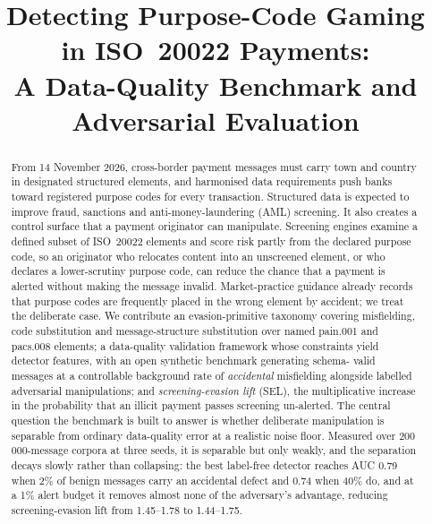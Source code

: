 \documentclass[conference]{IEEEtran}
\begin{document}
\title{Detecting Purpose-Code Gaming in ISO~20022 Payments:\\
A Data-Quality Benchmark and Adversarial Evaluation}

\author{
}

\maketitle

\begin{abstract}
From 14 November 2026, cross-border payment messages must carry town and
country in designated structured elements, and harmonised data requirements
push banks toward registered purpose codes for every transaction. Structured
data is expected to improve fraud, sanctions and anti-money-laundering (AML)
screening. It also creates a control surface that a payment originator can
manipulate. Screening engines examine a defined subset of ISO~20022 elements
and score risk partly from the declared purpose code, so an originator who
relocates content into an unscreened element, or who declares a
lower-scrutiny purpose code, can reduce the chance that a payment is alerted
without making the message invalid. Market-practice guidance already records
that purpose codes are frequently placed in the wrong element by accident; we
treat the deliberate case. We contribute an evasion-primitive taxonomy covering misfielding, code
substitution and message-structure substitution over named pain.001 and
pacs.008 elements; a data-quality validation framework whose constraints
yield detector features, with an open synthetic benchmark generating schema-
valid messages at a controllable background rate of \emph{accidental}
misfielding alongside labelled adversarial manipulations; and
\emph{screening-evasion lift} (SEL), the multiplicative increase in the
probability that an illicit payment passes screening un-alerted. The central question the benchmark is built to answer is whether
deliberate manipulation is separable from ordinary data-quality error at a
realistic noise floor. Measured over 200\,000-message corpora at three seeds,
it is separable but only weakly, and the separation decays slowly rather than
collapsing: the best label-free detector reaches AUC 0.79 when 2\% of benign
messages carry an accidental defect and 0.74 when 40\% do, and at a 1\% alert
budget it removes almost none of the adversary's advantage, reducing
screening-evasion lift from 1.45--1.78 to 1.44--1.75.
\end{abstract}
\end{document}
